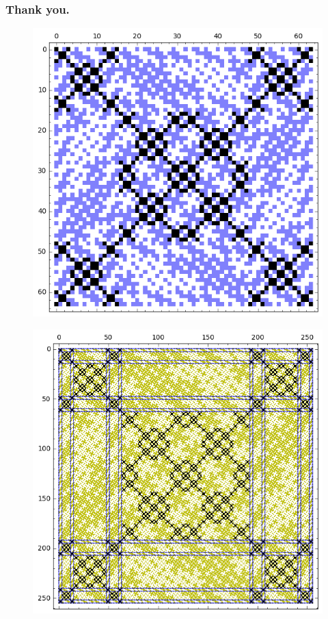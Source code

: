 \documentclass[pdf,sprung,slideColor,nocolorBG]{beamer}
\newenvironment{colortheme}[1]{
\def\ProvidesPackageRCS $##1${\relax}
\renewcommand{\ProcessOptions}{\relax}
\makeatletter

\makeatother
}{}
\begin{document}
\begin{colortheme}{jubata}

\begin{frame}
\frametitle{Thank you.}

\begin{figure}
\centering
\begin{minipage}{.48\textwidth}
  \centering
  \includegraphics[width=.9\linewidth]{../matrix_plot/tau_3_bent_cayley_graph_index_matrix.png}
  \label{fig:again_tau_3_bent_cayley_graph_index_matrix}
\end{minipage}
\begin{minipage}{.48\textwidth}
  \centering
  \includegraphics[width=.9\linewidth]{../matrix_plot/tau_4_bent_cayley_graph_index_matrix.png}
  \label{fig:again_tau_4_bent_cayley_graph_index_matrix}
\end{minipage}%
\end{figure}
\end{frame}

\end{colortheme}
\end{document}
